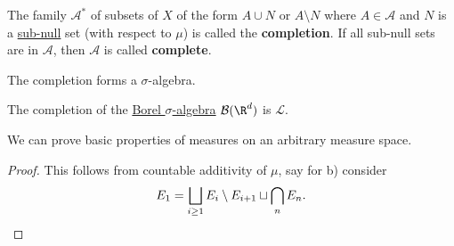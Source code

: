 \documentclass{article}
\newcommand{\1}[1]{\mathbbm{1}_{#1}}
\begin{document}
\begin{defi}
    The family $\mathcal{A}^*$ of subsets of $X$ of the form $A \cup N$ or $A \setminus N$ where $A \in \mathcal{A}$ and $N$ is a \hyperlink{def:null2}{sub-null} set (with respect to $\mu$) is called the \textbf{completion}.
    If all sub-null sets are in $\mathcal{A}$, then $\mathcal{A}$ is called \textbf{complete}.
\end{defi}

\begin{prop}
    The completion forms a $\sigma$-algebra.
\end{prop}

\begin{eg}
    The completion of the \hyperlink{def:borelAlg}{Borel $\sigma$-algebra} $\mathcal{B}(\R^d)$ is $\mathcal{L}$.
\end{eg}

We can prove basic properties of measures on an arbitrary measure space.


\begin{proof}
    This follows from countable additivity of $\mu$, say for b) consider
    \begin{equation*}
        E_1 = \bigsqcup_{i \geq 1} E_i \setminus E_{i+1} \sqcup \bigcap_n E_n. \qedhere
    \end{equation*}
\end{proof}
\end{document}
